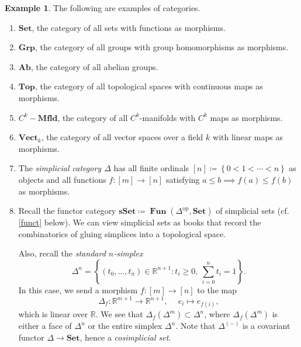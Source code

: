 \documentclass[10pt,letterpaper,cm]{nupset}
\theoremstyle{definition}
\newtheorem{exmp}[definition]{Example}
\theoremstyle{theorem}
\theoremstyle{remark}
\newcommand{\R}{\mathbb R}
\newcommand{\1}{\mathbf{1}}
\newcommand{\0}{\vec 0}
\DeclareMathOperator{\op}{op}
\DeclareMathOperator{\Fun}{\mathbf{Fun}}
\begin{document}
\begin{exmp} The following are examples of categories.
\begin{enumerate}
\item $\mathbf{Set}$, the category of all sets with functions as morphisms.
\item $\mathbf{Grp}$, the category of all groups with group homomorphisms as morphisms.
\item $\mathbf{Ab}$, the category of all abelian groups.
\item $\mathbf{Top}$, the category of all topological spaces with continuous maps as morphisms.
\item $C^k{-}\mathbf{Mfld}$, the category of all $C^k$-manifolds with $C^k$ maps as morphisms.
\item $\mathbf{Vect}_k$, the category of all vector spaces over a field $k$ with linear maps as morphisms.
\item The \textit{simplicial category $\varDelta$} has all finite ordinals $\left[n\right] \coloneqq \left\{0 < 1 < \cdots < n\right\}$ as objects and all functions $f : \left[m\right] \to \left[n\right]$ satisfying $a \leq b \implies f(a) \leq f(b)$ as morphisms.
\item Recall the functor category $\mathbf{sSet} \coloneqq \Fun(\varDelta^{\op}, \mathbf{Set})$ of simplicial sets (cf. \cref{funct} below). We can view simplicial sets as books that record the combinatorics of gluing
simplices into a topological space. 

 Also, recall the \textit{standard $n$-simplex} $$\Delta^n = \left\{(t_0, \ldots, t_n) \in \R^{n+1} : t_i \geq 0, \ \sum_{i=0}^n t_i =1\right\}.$$ In this case, we send a morphism $f : [m] \to [n]$ to the map $$\Delta_f : \R^{m+1} \to \R^{n+1}, \ \quad e_i \mapsto e_{f(i)},$$ which is linear over $\R$. We see that $\Delta_f(\Delta^m) \subset \Delta^n$, where $\Delta_f(\Delta^m)$ is either a face of $\Delta^n$ or the entire simplex $\Delta^n$. Note that $\Delta^{(-)}$ is a covariant functor $\varDelta \to \mathbf{Set}$, hence a \textit{cosimplicial set}. 



\end{enumerate}
\end{exmp}
\end{document}
